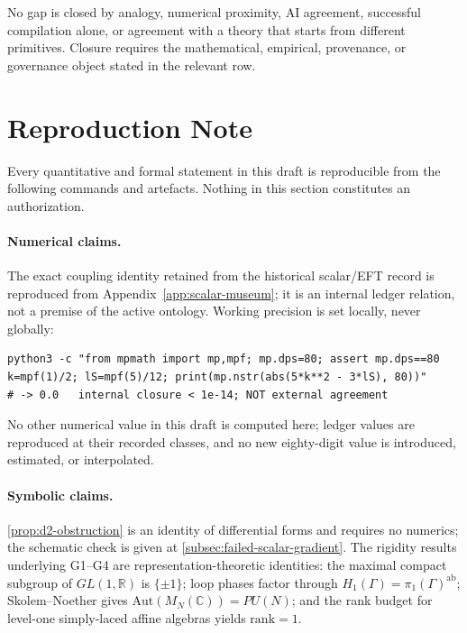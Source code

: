 \documentclass[12pt,a4paper,twoside]{article}
\theoremstyle{plain}
\theoremstyle{definition}
\theoremstyle{remark}
\begin{document}
\begin{governancebox}
No gap is closed by analogy, numerical proximity, AI agreement, successful
compilation alone, or agreement with a theory that starts from different
primitives. Closure requires the mathematical, empirical, provenance, or
governance object stated in the relevant row.
\end{governancebox}

\section{Reproduction Note}
\label{sec:reproduction-note}

\noindent Every quantitative and formal statement in this draft is
reproducible from the following commands and artefacts. Nothing in this
section constitutes an authorization.

\paragraph{Numerical claims.}
The exact coupling identity retained from the historical scalar/EFT record
is reproduced from Appendix~\ref{app:scalar-museum}; it is an internal
ledger relation, not a premise of the active ontology. Working precision
is set locally, never globally:
\begin{verbatim}
python3 -c "from mpmath import mp,mpf; mp.dps=80; assert mp.dps==80
k=mpf(1)/2; lS=mpf(5)/12; print(mp.nstr(abs(5*k**2 - 3*lS), 80))"
# -> 0.0   internal closure < 1e-14; NOT external agreement
\end{verbatim}
No other numerical value in this draft is computed here; ledger values
are reproduced at their recorded classes, and no new eighty-digit value
is introduced, estimated, or interpolated.

\paragraph{Symbolic claims.}
\cref{prop:d2-obstruction} is an identity of differential forms and
requires no numerics; the schematic check is given at
\cref{subsec:failed-scalar-gradient}. The rigidity results underlying
G1--G4 are representation-theoretic identities: the maximal compact
subgroup of $GL(1,\mathbb{R})$ is $\{\pm 1\}$; loop phases factor
through $H_1(\Gamma) = \pi_1(\Gamma)^{\mathrm{ab}}$; Skolem--Noether
gives $\mathrm{Aut}(M_N(\mathbb{C})) = PU(N)$; and the rank budget for
level-one simply-laced affine algebras yields $\mathrm{rank} = 1$.
\end{document}
